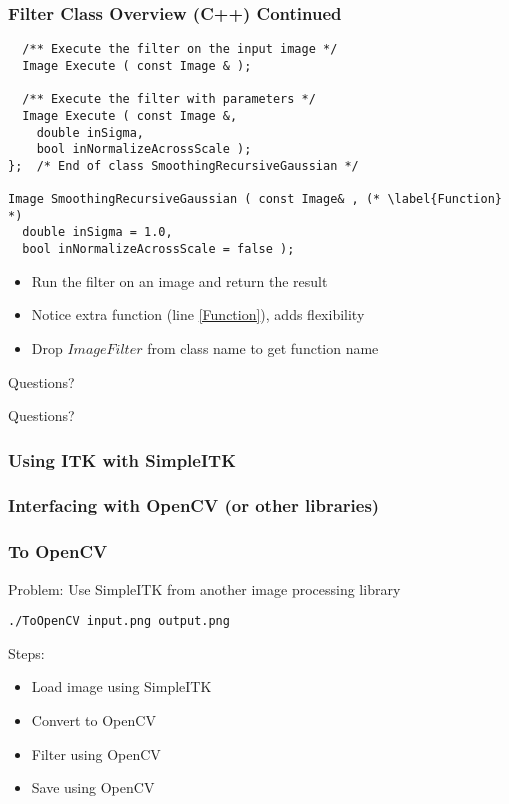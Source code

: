 \begin{frame}[fragile]
\frametitle{Filter Class Overview (C++) Continued}
\lstcpp
\begin{lstlisting}
  /** Execute the filter on the input image */
  Image Execute ( const Image & );

  /** Execute the filter with parameters */
  Image Execute ( const Image &,
    double inSigma,
    bool inNormalizeAcrossScale );
};  /* End of class SmoothingRecursiveGaussian */

Image SmoothingRecursiveGaussian ( const Image& , (* \label{Function} *)
  double inSigma = 1.0,
  bool inNormalizeAcrossScale = false );

\end{lstlisting}
\begin{itemize}
  \item Run the filter on an image and return the result
  \item Notice extra function (line \ref{Function}), adds flexibility
  \item Drop $ImageFilter$ from class name to get function name
\end{itemize}

\end{frame}

\begin{frame}{Questions?}
\fontsize{36pt}{36pt}\selectfont
\center
\begin{center}
Questions?
\end{center}
\end{frame}



\begin{frame}
\frametitle{Using ITK with SimpleITK}
\end{frame}

\begin{frame}
\frametitle{Interfacing with OpenCV (or other libraries)}
\end{frame}

\begin{frame}[fragile]
\frametitle{To OpenCV}
Problem: Use SimpleITK from another image processing library

\texttt{./ToOpenCV input.png output.png}

Steps:
\begin{itemize}
\item Load image using SimpleITK
\item Convert to OpenCV
\item Filter using OpenCV
\item Save using OpenCV
\end{itemize}
\end{frame}


